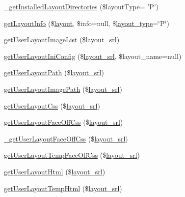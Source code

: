 \begin{DoxyCompactItemize}
\item 
\hyperlink{classlayoutModel_a4f50b5c829bf7c601a2938974a9a3b98}{\+\_\+get\+Installed\+Layout\+Directories} (\$layout\+Type= 'P')
\item 
\hyperlink{classlayoutModel_a8f49f0b017ffa5fc1d12efd0dfab7c96}{get\+Layout\+Info} (\$\hyperlink{classlayout}{layout}, \$info=null, \$\hyperlink{ko_8install_8php_a0532d89570cfdaebc628afac2ff5a81b}{layout\+\_\+type}=\char`\"{}P\char`\"{})
\item 
\hyperlink{classlayoutModel_a6bb9dc3b7dc427d7916bf2a743b8e412}{get\+User\+Layout\+Image\+List} (\$\hyperlink{ko_8install_8php_a70054876db09b2519a1726663c8dd9e7}{layout\+\_\+srl})
\item 
\hyperlink{classlayoutModel_acf8661d658078547d762fb582f09e3b9}{get\+User\+Layout\+Ini\+Config} (\$\hyperlink{ko_8install_8php_a70054876db09b2519a1726663c8dd9e7}{layout\+\_\+srl}, \$layout\+\_\+name=null)
\item 
\hyperlink{classlayoutModel_ad852fe1c8eab29b23c998560031eabe4}{get\+User\+Layout\+Path} (\$\hyperlink{ko_8install_8php_a70054876db09b2519a1726663c8dd9e7}{layout\+\_\+srl})
\item 
\hyperlink{classlayoutModel_a8d7574bcc9329207e6cc1eb2da163288}{get\+User\+Layout\+Image\+Path} (\$\hyperlink{ko_8install_8php_a70054876db09b2519a1726663c8dd9e7}{layout\+\_\+srl})
\item 
\hyperlink{classlayoutModel_a1c4e0310f7fce01392ddae5eeb849a5c}{get\+User\+Layout\+Css} (\$\hyperlink{ko_8install_8php_a70054876db09b2519a1726663c8dd9e7}{layout\+\_\+srl})
\item 
\hyperlink{classlayoutModel_a82cac2109b93170e8f573576de2eb0d0}{get\+User\+Layout\+Face\+Off\+Css} (\$\hyperlink{ko_8install_8php_a70054876db09b2519a1726663c8dd9e7}{layout\+\_\+srl})
\item 
\hyperlink{classlayoutModel_ab8fbcb8e92739d001e4a010bc5c5cf3b}{\+\_\+get\+User\+Layout\+Face\+Off\+Css} (\$\hyperlink{ko_8install_8php_a70054876db09b2519a1726663c8dd9e7}{layout\+\_\+srl})
\item 
\hyperlink{classlayoutModel_aadc68d3ed9d3706536ff8d93d1aebd56}{get\+User\+Layout\+Temp\+Face\+Off\+Css} (\$\hyperlink{ko_8install_8php_a70054876db09b2519a1726663c8dd9e7}{layout\+\_\+srl})
\item 
\hyperlink{classlayoutModel_ae1d2250f4bb3703f82998937c46a0a57}{get\+User\+Layout\+Html} (\$\hyperlink{ko_8install_8php_a70054876db09b2519a1726663c8dd9e7}{layout\+\_\+srl})
\item 
\hyperlink{classlayoutModel_a19aaacba7d0b1c9bb466534933595381}{get\+User\+Layout\+Temp\+Html} (\$\hyperlink{ko_8install_8php_a70054876db09b2519a1726663c8dd9e7}{layout\+\_\+srl})

\end{DoxyCompactItemize}
